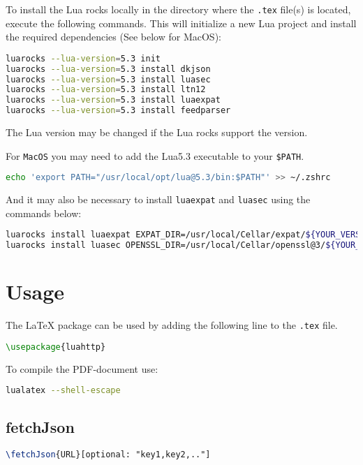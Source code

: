 \documentclass[11pt]{article}
\begin{document}
To install the Lua rocks locally in the directory where the \lstinline{.tex} file(s) is located, execute the following commands. This will initialize a new Lua project and install the required dependencies (See below for MacOS):

\begin{lstlisting}[language=bash]
luarocks --lua-version=5.3 init
luarocks --lua-version=5.3 install dkjson
luarocks --lua-version=5.3 install luasec
luarocks --lua-version=5.3 install ltn12
luarocks --lua-version=5.3 install luaexpat
luarocks --lua-version=5.3 install feedparser
\end{lstlisting}

The Lua version may be changed if the Lua rocks support the version.

For \texttt{MacOS} you may need to add the Lua5.3 executable to your \texttt{\$PATH}.
\begin{lstlisting}[language=bash]
echo 'export PATH="/usr/local/opt/lua@5.3/bin:$PATH"' >> ~/.zshrc
\end{lstlisting}

And it may also be necessary to install \texttt{luaexpat} and \texttt{luasec} using the commands below:
\begin{lstlisting}[language=bash]
luarocks install luaexpat EXPAT_DIR=/usr/local/Cellar/expat/${YOUR_VERSION_HERE}
luarocks install luasec OPENSSL_DIR=/usr/local/Cellar/openssl@3/${YOUR_VERSION_HERE}
\end{lstlisting}

\section{Usage}
The LaTeX package can be used by adding the following line to the \texttt{.tex} file.
\begin{lstlisting}[language=tex]
\usepackage{luahttp}
\end{lstlisting}

To compile the PDF-document use:
\begin{lstlisting}[language=bash]
lualatex --shell-escape
\end{lstlisting}

\subsection{fetchJson}

\begin{lstlisting}[language=tex]
\fetchJson{URL}[optional: "key1,key2,.."]
\end{lstlisting}
\end{document}
